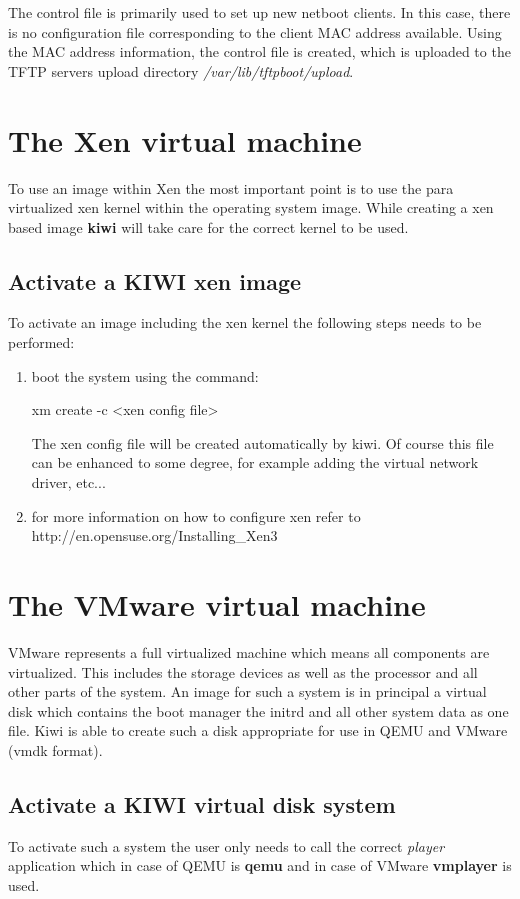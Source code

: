 The control file is primarily used to set up new netboot clients. In this
case, there is no configuration file corresponding to the client
MAC address available. Using the MAC address information, the control file
is created, which is uploaded to the TFTP servers upload directory
\textit{/var/lib/tftpboot/upload}.

\section{The Xen virtual machine}
To use an image within Xen the most important point is to use
the para virtualized xen kernel within the operating system image.
While creating a xen based image \textbf{kiwi} will take care
for the correct kernel to be used.

\subsection{Activate a KIWI xen image}
To activate an image including the xen kernel the following steps
needs to be performed:

\begin{enumerate}
	\item boot the system using the command:

          \begin{Command}{9cm}
          xm create -c <xen config file>
          \end{Command}

          The xen config file will be created automatically by kiwi.
          Of course this file can be enhanced to some degree, for example
          adding the virtual network driver, etc...

    \item for more information on how to configure xen refer to\\
          http://en.opensuse.org/Installing\_Xen3
\end{enumerate}

\section{The VMware virtual machine}
VMware represents a full virtualized machine which means all components
are virtualized. This includes the storage devices as well as the
processor and all other parts of the system. An image for such a system
is in principal a virtual disk which contains the boot manager the
initrd and all other system data as one file. Kiwi is able to create
such a disk appropriate for use in QEMU and VMware (vmdk format).

\subsection{Activate a KIWI virtual disk system}
To activate such a system the user only needs to call the correct
\textit{player} application which in case of QEMU is \textbf{qemu} and
in case of VMware \textbf{vmplayer} is used.
